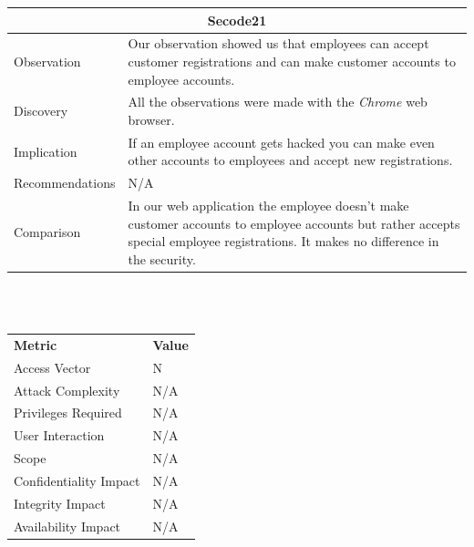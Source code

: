 \documentclass[headsepline,footsepline,footinclude=false,oneside,fontsize=11pt,paper=a4,listof=totoc,bibliography=totoc]{scrbook} %
\begin{document}
\begin{tabular}{ l|p{11cm}  }
	\hline
	\multicolumn{2}{c}{\textbf{Secode21}} \\
	\hline
	Observation   & Our observation showed us that employees can accept customer registrations and can make customer accounts to employee accounts. \\
	Discovery  & All the observations were made with the \textit{Chrome} web browser. \\
	Implication    & If an employee account gets hacked you can make even other accounts to employees and accept new registrations. \\
	Recommendations & N/A \\
	Comparison & In our web application the employee doesn't make customer accounts to employee accounts but rather accepts special employee registrations. It makes no difference in the security. \\
	\hline
\end{tabular}
\\
\vspace{0.5cm}
\\
\begin{center}
	\begin{tabular}{ll}
		\rowcolor[HTML]{34CDF9}
		{\color[HTML]{ECF4FF} \textbf{Metric}}        & {\color[HTML]{ECF4FF} \textbf{Value}} \\
		\rowcolor[HTML]{BBDAFF}
		{\color[HTML]{333333} Access Vector}          & {\color[HTML]{333333} } N              \\
		\rowcolor[HTML]{ECF4FF}
		{\color[HTML]{333333} Attack Complexity}      & {\color[HTML]{333333} } N/A              \\
		\rowcolor[HTML]{BBDAFF}
		{\color[HTML]{333333} Privileges Required}    & {\color[HTML]{333333} } N/A              \\
		\rowcolor[HTML]{ECF4FF}
		{\color[HTML]{333333} User Interaction}       & {\color[HTML]{333333} } N/A              \\
		\rowcolor[HTML]{BBDAFF}
		{\color[HTML]{333333} Scope}                  & {\color[HTML]{333333} } N/A              \\
		\rowcolor[HTML]{ECF4FF}
		{\color[HTML]{333333} Confidentiality Impact} & {\color[HTML]{333333} } N/A              \\
		\rowcolor[HTML]{BBDAFF}
		{\color[HTML]{333333} Integrity Impact}       & {\color[HTML]{333333} } N/A              \\
		\rowcolor[HTML]{ECF4FF}
		{\color[HTML]{333333} Availability Impact}    & {\color[HTML]{333333} } N/A
	\end{tabular}
\end{center}
\pagebreak
\end{document}

